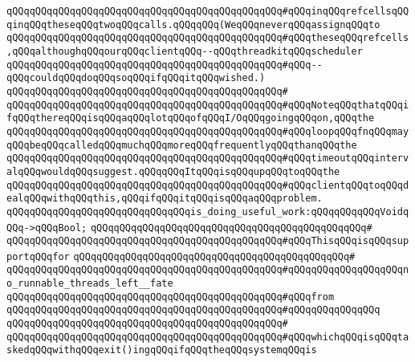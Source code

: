 \verb|qQQqqQQqqQQqqQQqqQQqqQQqqQQqqQQqqQQqqQQqqQQqqQQq#qQQqinqQQqrefcellsqQQqinqQQqtheseqQQqtwoqQQqcalls.qQQqqQQq(WeqQQqneverqQQqassignqQQqto|\newline
\verb|qQQqqQQqqQQqqQQqqQQqqQQqqQQqqQQqqQQqqQQqqQQqqQQq#qQQqtheseqQQqrefcells,qQQqalthoughqQQqourqQQqclientqQQq--qQQqthreadkitqQQqscheduler|\newline
\verb|qQQqqQQqqQQqqQQqqQQqqQQqqQQqqQQqqQQqqQQqqQQqqQQq#qQQq--qQQqcouldqQQqdoqQQqsoqQQqifqQQqitqQQqwished.)|\newline
\verb|qQQqqQQqqQQqqQQqqQQqqQQqqQQqqQQqqQQqqQQqqQQqqQQq#|\newline
\verb|qQQqqQQqqQQqqQQqqQQqqQQqqQQqqQQqqQQqqQQqqQQqqQQq#qQQqNoteqQQqthatqQQqifqQQqthereqQQqisqQQqaqQQqlotqQQqofqQQqI/OqQQqgoingqQQqon,qQQqthe|\newline
\verb|qQQqqQQqqQQqqQQqqQQqqQQqqQQqqQQqqQQqqQQqqQQqqQQq#qQQqloopqQQqfnqQQqmayqQQqbeqQQqcalledqQQqmuchqQQqmoreqQQqfrequentlyqQQqthanqQQqthe|\newline
\verb|qQQqqQQqqQQqqQQqqQQqqQQqqQQqqQQqqQQqqQQqqQQqqQQq#qQQqtimeoutqQQqintervalqQQqwouldqQQqsuggest.qQQqqQQqItqQQqisqQQqupqQQqtoqQQqthe|\newline
\verb|qQQqqQQqqQQqqQQqqQQqqQQqqQQqqQQqqQQqqQQqqQQqqQQq#qQQqclientqQQqtoqQQqdealqQQqwithqQQqthis,qQQqifqQQqitqQQqisqQQqaqQQqproblem.|\newline
\newline
\verb|qQQqqQQqqQQqqQQqqQQqqQQqqQQqqQQqis_doing_useful_work:qQQqqQQqqQQqVoidqQQq->qQQqBool;|\newline
\verb|qQQqqQQqqQQqqQQqqQQqqQQqqQQqqQQqqQQqqQQqqQQqqQQq#|\newline
\verb|qQQqqQQqqQQqqQQqqQQqqQQqqQQqqQQqqQQqqQQqqQQqqQQq#qQQqThisqQQqisqQQqsupportqQQqfor|\newline
\verb|qQQqqQQqqQQqqQQqqQQqqQQqqQQqqQQqqQQqqQQqqQQqqQQq#|\newline
\verb|qQQqqQQqqQQqqQQqqQQqqQQqqQQqqQQqqQQqqQQqqQQqqQQq#qQQqqQQqqQQqqQQqqQQqno_runnable_threads_left__fate|\newline
\verb|qQQqqQQqqQQqqQQqqQQqqQQqqQQqqQQqqQQqqQQqqQQqqQQq#qQQqfrom|\newline
\verb|qQQqqQQqqQQqqQQqqQQqqQQqqQQqqQQqqQQqqQQqqQQqqQQq#qQQqqQQqqQQqqQQq|\newline
\verb|qQQqqQQqqQQqqQQqqQQqqQQqqQQqqQQqqQQqqQQqqQQqqQQq#|\newline
\verb|qQQqqQQqqQQqqQQqqQQqqQQqqQQqqQQqqQQqqQQqqQQqqQQq#qQQqwhichqQQqisqQQqtaskedqQQqwithqQQqexit()ingqQQqifqQQqtheqQQqsystemqQQqis|\newline
